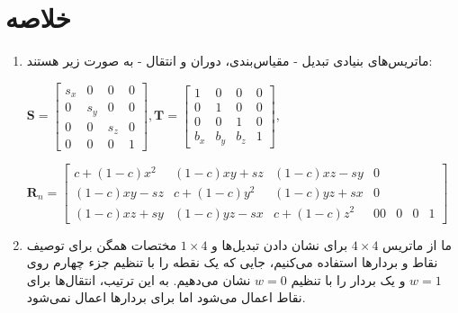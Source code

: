 \section{\textbf{خلاصه}}
\label{sec:3.7}
{
    \Large
    \begin{spacing}{1.5}
        \begin{enumerate}[label=\textbf{\arabic*}.]
            \item {ماتریس‌های بنیادی تبدیل - مقیاس‌بندی، دوران و انتقال - به صورت زیر هستند:
                \begin{center}
                    $\textbf{S}=\begin{bmatrix}
                                    s_x & 0   & 0   & 0 \\
                                    0   & s_y & 0   & 0 \\
                                    0   & 0   & s_z & 0 \\
                                    0   & 0   & 0   & 1
                    \end{bmatrix},\textbf{T}=\begin{bmatrix}
                                                 1     & 0     & 0     & 0 \\
                                                 0     & 1     & 0     & 0 \\
                                                 0     & 0     & 1     & 0 \\
                                                 b_{x} & b_{y} & b_{z} & 1
                    \end{bmatrix},$
                \end{center}

                $\textbf{R}_{n}=\begin{bmatrix}
                                    c+(1-c)x^{2} & (1-c)xy+sz & (1-c)xz-sy & 0\\
                                    (1-c)xy-sz & c+(1-c)y^{2} & (1-c)yz+sx & 0\\
                                    (1-c)xz+sy & (1-c)yz-sx & c+(1-c)z^{2} & 0
                                    0 & 0 & 0 & 1
                \end{bmatrix}$
            }

            \item {ما از ماتریس $4\times 4$ برای نشان دادن تبدیل‌ها و $1\times 4$ مختصات همگن برای توصیف نقاط و بردارها استفاده می‌کنیم،
            جایی که یک نقطه را با تنظیم جزء چهارم روی $w=1$ و یک بردار را با تنظیم $w=0$ نشان می‌دهیم.
            به این ترتیب، انتقال‌ها برای نقاط اعمال می‌شود اما برای بردارها اعمال نمی‌شود.}


\end{enumerate}
\end{spacing}}
